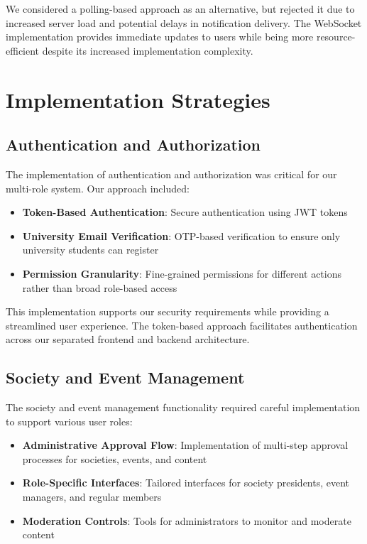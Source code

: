 We considered a polling-based approach as an alternative, but rejected it due to increased server load and potential delays in notification delivery. The WebSocket implementation provides immediate updates to users while being more resource-efficient despite its increased implementation complexity.

\section{Implementation Strategies}

\subsection{Authentication and Authorization}

The implementation of authentication and authorization was critical for our multi-role system. Our approach included:

\begin{itemize}
    \item \textbf{Token-Based Authentication}: Secure authentication using JWT tokens
    \item \textbf{University Email Verification}: OTP-based verification to ensure only university students can register
    \item \textbf{Permission Granularity}: Fine-grained permissions for different actions rather than broad role-based access
\end{itemize}

This implementation supports our security requirements while providing a streamlined user experience. The token-based approach facilitates authentication across our separated frontend and backend architecture.

\subsection{Society and Event Management}

The society and event management functionality required careful implementation to support various user roles:

\begin{itemize}
    \item \textbf{Administrative Approval Flow}: Implementation of multi-step approval processes for societies, events, and content
    \item \textbf{Role-Specific Interfaces}: Tailored interfaces for society presidents, event managers, and regular members
    \item \textbf{Moderation Controls}: Tools for administrators to monitor and moderate content
\end{itemize}


